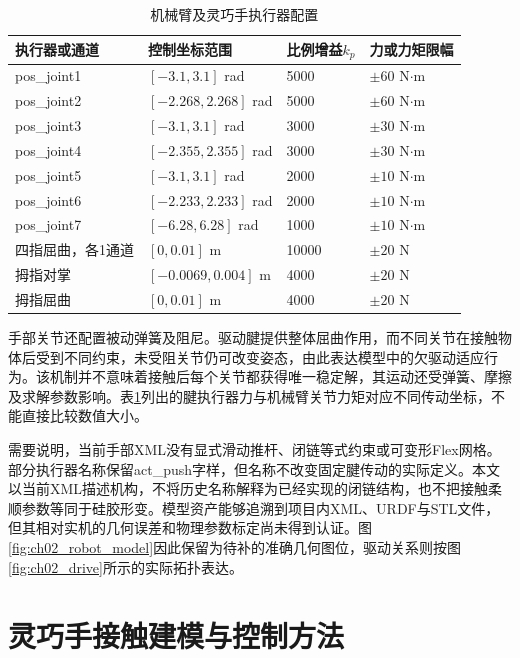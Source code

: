 \begin{table}[htbp]
  \centering\small
  \caption{机械臂及灵巧手执行器配置}
  \label{tab:ch02_actuators}
  \begin{tabular}{p{}p{}p{}p{}}
    \hline
    执行器或通道 & 控制坐标范围 & 比例增益$k_p$ & 力或力矩限幅\\
    \hline
    pos\_joint1 & $[-3.1,3.1]$ rad & 5000 & $\pm60$ N$\cdot$m\\
    pos\_joint2 & $[-2.268,2.268]$ rad & 5000 & $\pm60$ N$\cdot$m\\
    pos\_joint3 & $[-3.1,3.1]$ rad & 3000 & $\pm30$ N$\cdot$m\\
    pos\_joint4 & $[-2.355,2.355]$ rad & 3000 & $\pm30$ N$\cdot$m\\
    pos\_joint5 & $[-3.1,3.1]$ rad & 2000 & $\pm10$ N$\cdot$m\\
    pos\_joint6 & $[-2.233,2.233]$ rad & 2000 & $\pm10$ N$\cdot$m\\
    pos\_joint7 & $[-6.28,6.28]$ rad & 1000 & $\pm10$ N$\cdot$m\\
    四指屈曲，各1通道 & $[0,0.01]$ m & 10000 & $\pm20$ N\\
    拇指对掌 & $[-0.0069,0.004]$ m & 4000 & $\pm20$ N\\
    拇指屈曲 & $[0,0.01]$ m & 4000 & $\pm20$ N\\
    \hline
  \end{tabular}
\end{table}

手部关节还配置被动弹簧及阻尼。驱动腱提供整体屈曲作用，而不同关节在接触物体后受到不同约束，未受阻关节仍可改变姿态，由此表达模型中的欠驱动适应行为。该机制并不意味着接触后每个关节都获得唯一稳定解，其运动还受弹簧、摩擦及求解参数影响。表\ref{tab:ch02_actuators}列出的腱执行器力与机械臂关节力矩对应不同传动坐标，不能直接比较数值大小。

需要说明，当前手部XML没有显式滑动推杆、闭链等式约束或可变形Flex网格。部分执行器名称保留act\_push字样，但名称不改变固定腱传动的实际定义。本文以当前XML描述机构，不将历史名称解释为已经实现的闭链结构，也不把接触柔顺参数等同于硅胶形变。模型资产能够追溯到项目内XML、URDF与STL文件，但其相对实机的几何误差和物理参数标定尚未得到认证。图\ref{fig:ch02_robot_model}因此保留为待补的准确几何图位，驱动关系则按图\ref{fig:ch02_drive}所示的实际拓扑表达。

\section{灵巧手接触建模与控制方法}
\label{sec:contact_control}

